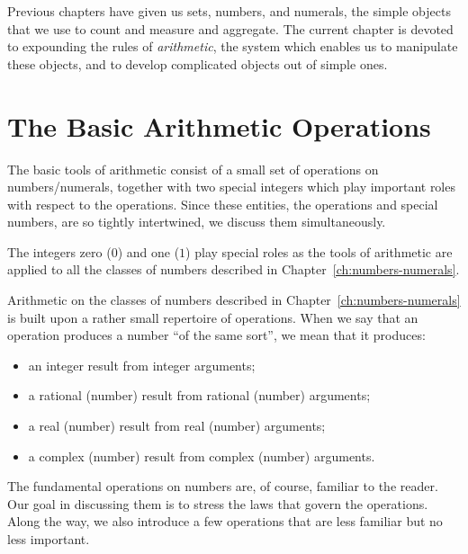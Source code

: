 \vspace*{.5in}

\noindent
Previous chapters have given us sets, numbers, and numerals, the simple objects that we use to count and measure and aggregate.  The current chapter is devoted to expounding the rules of {\em arithmetic}, the system which enables us to manipulate these objects, and to develop complicated objects out of simple ones.

\section{The Basic Arithmetic Operations}
\label{sec:Arithmetic-Tools}

The basic tools of arithmetic consist of a small set of operations on numbers/numerals, together with two special integers which play important roles with respect to the operations.  Since these entities, the operations and special numbers, are so tightly intertwined, we discuss them simultaneously.

\smallskip


 

The integers zero ($0$)  and one ($1$) play special roles as the tools of arithmetic are applied to all the classes of numbers described in Chapter~\ref{ch:numbers-numerals}.

\smallskip


Arithmetic on the classes of numbers described in Chapter~\ref{ch:numbers-numerals} is built upon a rather small repertoire of operations.  When we say that an operation produces a number ``of the same sort'', we mean that it produces:
\begin{itemize}
\item
an integer result from integer arguments;
\medskip\item
a rational (number) result from rational (number) arguments;
\medskip\item
a real (number) result from real (number) arguments;
\medskip\item
a complex (number) result from complex (number) arguments.
\end{itemize}
The fundamental operations on numbers are, of course, familiar to the reader.  Our goal in discussing them is to stress the laws that govern the operations.  Along the way, we also introduce a few operations that are less familiar but no less important.

